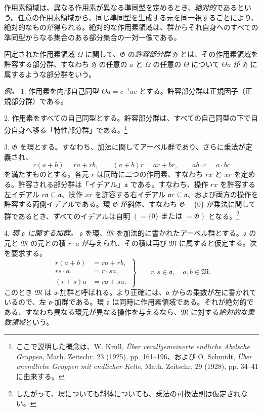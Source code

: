 \documentclass[11pt]{article}
\providecommand{\mG}{\mathfrak{G}}
\providecommand{\mH}{\mathfrak{H}}
\providecommand{\mM}{\mathfrak{M}}
\providecommand{\mo}{\mathfrak{o}}
\begin{document}
作用素領域は、異なる作用素が異なる準同型を定めるとき、\emph{絶対的}であるという。任意の作用素領域から、同じ準同型を生成する元を同一視することにより、絶対的なものが得られる。絶対的な作用素領域は、群からそれ自身へのすべての準同型からなる集合のある部分集合の一対一像である。

固定された作用素領域 $\Omega$ に関して、$\mG$ の\emph{許容部分群} $\mH$ とは、その作用素領域を許容する部分群、すなわち $\mH$ の任意の $a$ と $\Omega$ の任意の $\Theta$ について $\Theta a$ が $\mH$ に属するような部分群をいう。

\emph{例。} 1. 作用素を内部自己同型 $\Theta a=c^{-1}ac$ とする。許容部分群は正規因子（正規部分群）である。

2. 作用素をすべての自己同型とする。許容部分群は、すべての自己同型の下で自分自身へ移る「特性部分群」である。\footnote{ここで説明した概念は、W. Krull, \emph{Über verallgemeinerte endliche Abelsche Gruppen}, Math. Zeitschr. 23 (1925), pp. 161--196、および O. Schmidt, \emph{Über unendliche Gruppen mit endlicher Kette}, Math. Zeitschr. 29 (1928), pp. 34--41 に由来する。}

3. $\mG$ を環とする。すなわち、加法に関してアーベル群であり、さらに乗法が定義され、
\[
        r(a+b)=ra+rb,\qquad (a+b)r=ar+br,\qquad ab\cdot c=a\cdot bc
\]
を満たすものとする。各元 $r$ は同時に二つの作用素、すなわち $rx$ と $xr$ を定める。許容される部分群は「イデアル」$\mathfrak a$ である。すなわち、操作 $rx$ を許容する左イデアル $r\mathfrak a\subseteq\mathfrak a$、操作 $xr$ を許容する右イデアル $\mathfrak a r\subseteq\mathfrak a$、および両方の操作を許容する両側イデアルである。環 $\mG$ が斜体、すなわち $\mG-\{0\}$ が乗法に関して群であるとき、すべてのイデアルは自明 $(=\{0\}\text{ または }=\mG)$ となる。\footnote{したがって、環についても斜体についても、乗法の可換法則は仮定されない。}

4. \emph{環 $\mo$ に関する加群。} $\mo$ を環、$\mM$ を加法的に書かれたアーベル群とする。$\mo$ の元と $\mM$ の元との積 $r\cdot a$ が与えられ、その積は再び $\mM$ に属すると仮定する。次を要求する。
\[
\left.
\begin{aligned}
 r(a+b)&=ra+rb,\\
 rs\cdot a&=r\cdot sa,\\
 (r+s)a&=ra+sa,
\end{aligned}
\right\}\qquad r,s\in\mo,\quad a,b\in\mM.
\]
このとき $\mM$ は $\mo$-加群と呼ばれる。より正確には、$\mo$ からの乗数が左に書かれているので、左 $\mo$-加群である。環 $\mo$ は同時に作用素領域である。それが絶対的である、すなわち異なる環元が異なる操作を与えるなら、$\mM$ に対する\emph{絶対的な乗数領域}という。
\end{document}
